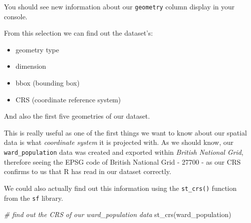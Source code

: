 \documentclass[
]{book}
\newenvironment{Shaded}{\begin{snugshade}}{\end{snugshade}}
\newcommand{\CommentTok}[1]{\textcolor[rgb]{0.56,0.35,0.01}{\textit{#1}}}
\newcommand{\FunctionTok}[1]{\textcolor[rgb]{0.00,0.00,0.00}{#1}}
\newcommand{\NormalTok}[1]{#1}
\providecommand{\tightlist}{%
  \setlength{\itemsep}{0pt}\setlength{\parskip}{0pt}}
\begin{document}
You should see new information about our \texttt{geometry} column display in your console.

From this selection we can find out the dataset's:

\begin{itemize}
\tightlist
\item
  geometry type
\item
  dimension
\item
  bbox (bounding box)
\item
  CRS (coordinate reference system)
\end{itemize}

And also the first five geometries of our dataset.

This is really useful as one of the first things we want to know about our spatial data is what \emph{coordinate system} it is projected with. As we should know, our \texttt{ward\_population} data was created and exported within \emph{British National Grid}, therefore seeing the EPSG code of British National Grid - 27700 - as our CRS confirms to us that R has read in our dataset correctly.

We could also actually find out this information using the \texttt{st\_crs()} function from the \texttt{sf} library.

\begin{Shaded}
\begin{Highlighting}[]
\CommentTok{\# find out the CRS of our ward\_population data}
\FunctionTok{st\_crs}\NormalTok{(ward\_population)}
\end{Highlighting}
\end{Shaded}
\end{document}

